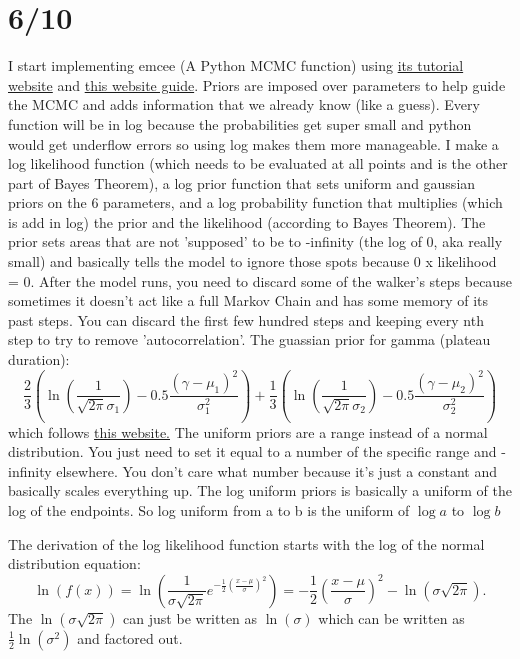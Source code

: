 \documentclass[12pt]{article}
\begin{document}
\section{6/10}
I start implementing emcee (A Python MCMC function) using \href{https://emcee.readthedocs.io/en/stable/tutorials/line/}{its tutorial website} and \href{https://prappleizer.github.io/Tutorials/MCMC/MCMC_Tutorial.html}{this website guide}. Priors are imposed over parameters to help guide the MCMC and adds information that we already know (like a guess). Every function will be in log because the probabilities get super small and python would get underflow errors so using log makes them more manageable. I make a log likelihood function (which needs to be evaluated at all points and is the other part of Bayes Theorem), a log prior function that sets uniform and gaussian priors on the 6 parameters, and a log probability function that multiplies (which is add in log) the prior and the likelihood (according to Bayes Theorem). The prior sets areas that are not 'supposed' to be to -infinity (the log of 0, aka really small) and basically tells the model to ignore those spots because 0 x likelihood = 0. After the model runs, you need to discard some of the walker's steps because sometimes it doesn't act like a full Markov Chain and has some memory of its past steps. You can discard the first few hundred steps and keeping every nth step to try to remove 'autocorrelation'. The guassian prior for gamma (plateau duration):
\begin{equation}
        \frac{2}{3}(\ln (\frac{1}{\sqrt{2\pi} \sigma_1}) - 0.5 \frac{(\gamma-\mu_1)^2}{\sigma_1^2}) + \frac{1}{3}(\ln (\frac{1}{\sqrt{2\pi} \sigma_2}) - 0.5 \frac{(\gamma-\mu_2)^2}{\sigma_2^2}) 
\end{equation}
which follows \href{https://stackoverflow.com/questions/49810234/using-emcee-with-gaussian-priors}{this website.}
The uniform priors are a range instead of a normal distribution. You just need to set it equal to a number of the specific range and - infinity elsewhere. You don't care what number because it's just a constant and basically scales everything up. The log uniform priors is basically a uniform of the log of the endpoints. So log uniform from a to b is the uniform of $\log a$ to $\log b$

The derivation of the log likelihood function starts with the log of the normal distribution equation: 
\begin{equation}
        \ln (f(x)) = \ln(\frac{1}{\sigma \sqrt{2\pi}} e ^{-\frac{1}{2}(\frac{x-\mu}{\sigma})^2}) = -\frac{1}{2}(\frac{x-\mu}{\sigma})^2 - \ln (\sigma \sqrt{2 \pi}).  
\end{equation}
The $\ln(\sigma \sqrt{2 \pi})$ can just be written as $\ln(\sigma)$ which can be written as $\frac{1}{2}\ln(\sigma ^2)$ and factored out. 
\end{document}
